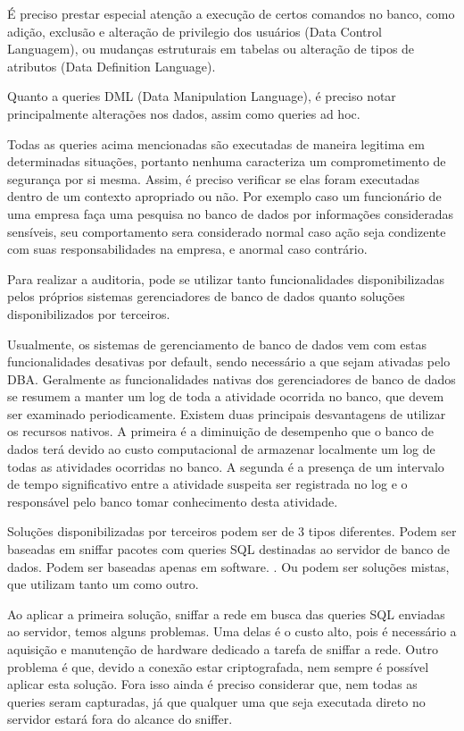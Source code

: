 \documentclass{article}
\begin{document}
É preciso prestar especial atenção a execução de certos comandos no banco, como adição, exclusão e alteração de privilegio dos usuários (Data Control Languagem), ou  mudanças estruturais em tabelas ou alteração de tipos de atributos (Data Definition Language).

Quanto a queries DML (Data Manipulation Language), é preciso notar principalmente alterações nos dados, assim como queries ad hoc.

Todas as queries acima mencionadas são executadas de maneira legitima em determinadas situações, portanto nenhuma caracteriza um comprometimento de segurança por si mesma. Assim, é preciso verificar se elas foram executadas dentro de um contexto apropriado ou não. Por exemplo caso um funcionário de uma empresa faça uma pesquisa no banco de dados por informações consideradas sensíveis, seu comportamento sera considerado normal caso ação seja condizente com suas responsabilidades na empresa, e anormal caso contrário.

Para realizar a auditoria, pode se utilizar tanto funcionalidades disponibilizadas pelos próprios sistemas gerenciadores de banco de dados quanto soluções disponibilizados por terceiros.

Usualmente, os sistemas de gerenciamento de banco de dados vem com estas funcionalidades desativas por default, sendo necessário a que sejam ativadas pelo DBA. Geralmente as funcionalidades nativas dos gerenciadores de banco de dados se resumem a manter um log de toda a atividade ocorrida no banco, que devem ser examinado periodicamente. Existem duas principais desvantagens de utilizar os recursos nativos. A primeira é a diminuição de desempenho que o banco de dados terá devido ao custo computacional de armazenar localmente um log de todas as atividades ocorridas no banco. A segunda é a presença de um intervalo de tempo significativo entre a atividade suspeita ser registrada no log e o responsável pelo banco tomar conhecimento desta atividade. 

Soluções disponibilizadas por terceiros podem ser de 3 tipos diferentes. Podem ser baseadas em sniffar pacotes com queries SQL destinadas ao servidor de banco de dados. Podem ser baseadas apenas em software. . Ou podem ser soluções mistas, que utilizam tanto um como outro.

Ao aplicar a primeira solução, sniffar a rede em busca das queries SQL enviadas ao servidor, temos alguns problemas. Uma delas é o custo alto, pois é necessário a aquisição e manutenção de hardware dedicado a tarefa de sniffar a rede. Outro problema é que, devido a conexão estar criptografada, nem sempre é possível aplicar esta solução. Fora isso ainda é preciso considerar que, nem todas as queries seram capturadas, já que qualquer  uma que seja executada direto no servidor estará fora do alcance do sniffer.
\end{document}
